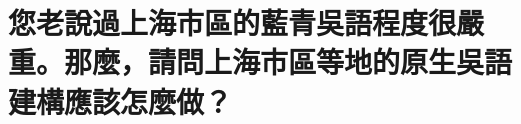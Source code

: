 %

\chapter[您老說過上海市區的藍青吳語程度很嚴重。那麼，請問上海市區等地的原生吳語建構應該怎麼做？]{您老說過上海市區的藍青吳語程度很嚴重。那麼，請問上海市區等地的原生吳語建構應該怎麼做？}

